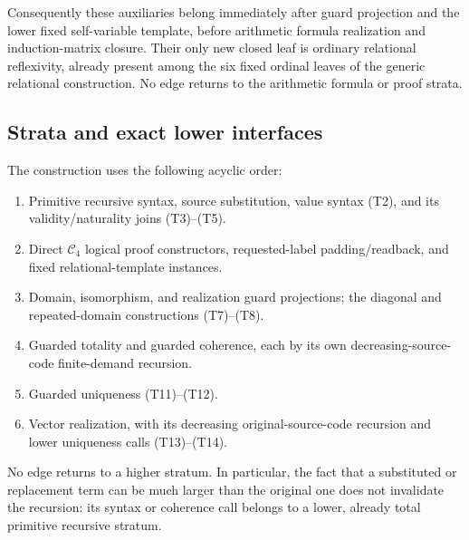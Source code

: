 Consequently these auxiliaries belong immediately after guard
projection and the lower fixed self-variable template, before
arithmetic formula realization and induction-matrix closure.
Their only new closed leaf is ordinary relational reflexivity,
already present among the six fixed ordinal leaves of the generic
relational construction.  No edge returns to the arithmetic
formula or proof strata.

\subsection{Strata and exact lower interfaces}

The construction uses the following acyclic order:
\begin{enumerate}
\item Primitive recursive syntax, source substitution, value syntax
      (T2), and its validity/naturality joins (T3)--(T5).
\item Direct $\mathcal C_4$ logical proof constructors, requested-label
      padding/readback, and fixed relational-template instances.
\item Domain, isomorphism, and realization guard projections; the
      diagonal and repeated-domain constructions (T7)--(T8).
\item Guarded totality and guarded coherence, each by its own
      decreasing-source-code finite-demand recursion.
\item Guarded uniqueness (T11)--(T12).
\item Vector realization, with its decreasing original-source-code
      recursion and lower uniqueness calls (T13)--(T14).
\end{enumerate}
No edge returns to a higher stratum.  In particular, the fact that a
substituted or replacement term can be much larger than the original
one does not invalidate the recursion: its syntax or coherence call
belongs to a lower, already total primitive recursive stratum.

